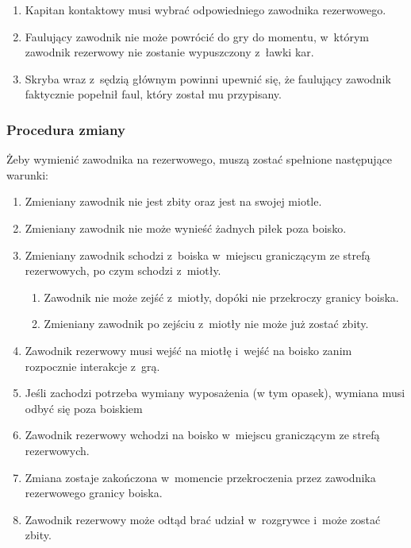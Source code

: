 \documentclass[12pt,a4paper]{article}
\begin{document}
\begin{enumerate}
\begin{enumerate}
		            \begin{enumerate}
			            \item
			                  Kapitan kontaktowy musi wybrać odpowiedniego zawodnika
			                  rezerwowego.
			            \item
			                  Faulujący zawodnik nie może powrócić do gry do momentu, w~którym
			                  zawodnik rezerwowy nie zostanie wypuszczony z~ławki kar.
			            \item
			                  Skryba wraz z~sędzią głównym powinni upewnić się, że faulujący
			                  zawodnik faktycznie popełnił faul, który został mu przypisany.
		            \end{enumerate}
	      \end{enumerate}
\end{enumerate}

\subsubsection{Procedura zmiany}

Żeby wymienić zawodnika na rezerwowego, muszą zostać spełnione
następujące warunki:

\begin{enumerate}
	\item
	      Zmieniany zawodnik nie jest zbity oraz jest na swojej miotle.
	\item
	      Zmieniany zawodnik nie może wynieść żadnych piłek poza boisko.
	\item
	      Zmieniany zawodnik schodzi z~boiska w~miejscu graniczącym ze strefą
	      rezerwowych, po czym schodzi z~miotły.

	      \begin{enumerate}
		      \item
		            Zawodnik nie może zejść z~miotły, dopóki nie przekroczy granicy
		            boiska.
		      \item
		            Zmieniany zawodnik po zejściu z~miotły nie może już zostać zbity.
	      \end{enumerate}
	\item
	      Zawodnik rezerwowy musi wejść na miotłę i~wejść na boisko zanim
	      rozpocznie interakcje z~grą.
	\item
	      Jeśli zachodzi potrzeba wymiany wyposażenia (w tym opasek), wymiana
	      musi odbyć się poza boiskiem
	\item
	      Zawodnik rezerwowy wchodzi na boisko w~miejscu graniczącym ze strefą
	      rezerwowych.
	\item
	      Zmiana zostaje zakończona w~momencie przekroczenia przez zawodnika
	      rezerwowego granicy boiska.
	\item
	      Zawodnik rezerwowy może odtąd brać udział w~rozgrywce i~może zostać
	      zbity.
\end{enumerate}
\end{document}

